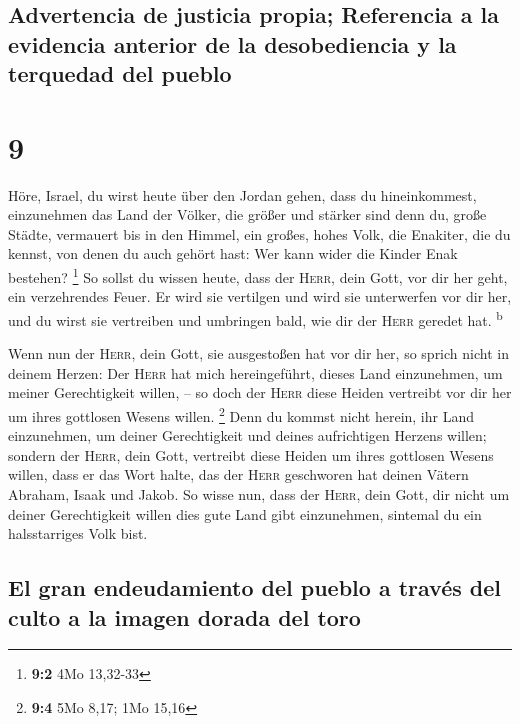 \hypertarget{advertencia-de-justicia-propia-referencia-a-la-evidencia-anterior-de-la-desobediencia-y-la-terquedad-del-pueblo}{%
\subsection{Advertencia de justicia propia; Referencia a la evidencia
anterior de la desobediencia y la terquedad del
pueblo}\label{advertencia-de-justicia-propia-referencia-a-la-evidencia-anterior-de-la-desobediencia-y-la-terquedad-del-pueblo}}

\hypertarget{section-8}{%
\section{9}\label{section-8}}

 Höre, Israel, du wirst heute über den Jordan gehen, dass
du hineinkommest, einzunehmen das Land der Völker, die größer und
stärker sind denn du, große Städte, vermauert bis in den Himmel,
 ein großes, hohes Volk, die Enakiter, die du kennst, von
denen du auch gehört hast: Wer kann wider die Kinder Enak bestehen?
\footnote{\textbf{9:2} 4Mo 13,32-33}  So sollst du wissen
heute, dass der \textsc{Herr}, dein Gott, vor dir her geht, ein
verzehrendes Feuer. Er wird sie vertilgen und wird sie unterwerfen vor
dir her, und du wirst sie vertreiben und umbringen bald, wie dir der
\textsc{Herr} geredet hat. \textsuperscript{b}

 Wenn nun der \textsc{Herr}, dein Gott, sie ausgestoßen
hat vor dir her, so sprich nicht in deinem Herzen: Der \textsc{Herr} hat
mich hereingeführt, dieses Land einzunehmen, um meiner Gerechtigkeit
willen, -- so doch der \textsc{Herr} diese Heiden vertreibt vor dir her
um ihres gottlosen Wesens willen. \footnote{\textbf{9:4} 5Mo 8,17; 1Mo
  15,16}  Denn du kommst nicht herein, ihr Land
einzunehmen, um deiner Gerechtigkeit und deines aufrichtigen Herzens
willen; sondern der \textsc{Herr}, dein Gott, vertreibt diese Heiden um
ihres gottlosen Wesens willen, dass er das Wort halte, das der
\textsc{Herr} geschworen hat deinen Vätern Abraham, Isaak und Jakob.
 So wisse nun, dass der \textsc{Herr}, dein Gott, dir
nicht um deiner Gerechtigkeit willen dies gute Land gibt einzunehmen,
sintemal du ein halsstarriges Volk bist.

\hypertarget{el-gran-endeudamiento-del-pueblo-a-travuxe9s-del-culto-a-la-imagen-dorada-del-toro}{%
\subsection{El gran endeudamiento del pueblo a través del culto a la
imagen dorada del
toro}\label{el-gran-endeudamiento-del-pueblo-a-travuxe9s-del-culto-a-la-imagen-dorada-del-toro}}

